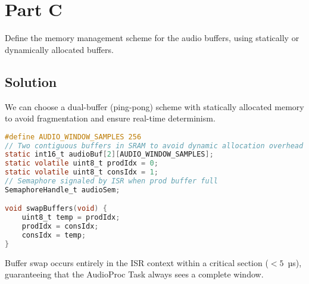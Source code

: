 \section*{Part C}

Define the memory management scheme for the audio buffers, using statically or dynamically allocated buffers.

\subsection*{Solution}

We can choose a dual-buffer (ping-pong) scheme with statically allocated memory to avoid fragmentation and ensure real-time determinism.

\begin{lstlisting}[language=C]
#define AUDIO_WINDOW_SAMPLES 256
// Two contiguous buffers in SRAM to avoid dynamic allocation overhead
static int16_t audioBuf[2][AUDIO_WINDOW_SAMPLES];
static volatile uint8_t prodIdx = 0;
static volatile uint8_t consIdx = 1;
// Semaphore signaled by ISR when prod buffer full
SemaphoreHandle_t audioSem;

void swapBuffers(void) {
    uint8_t temp = prodIdx;
    prodIdx = consIdx;
    consIdx = temp;
}
\end{lstlisting}

\noindent
Buffer swap occurs entirely in the ISR context within a critical section (\( < 5 \) \,µs), guaranteeing that the AudioProc Task always sees a complete window.
